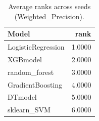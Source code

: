 \begin{table}[t]
\centering
\begin{tabular}{lr}
\toprule
Model & rank \\
\midrule
LogisticRegression & 1.0000 \\
XGBmodel & 2.0000 \\
random_forest & 3.0000 \\
GradientBoosting & 4.0000 \\
DTmodel & 5.0000 \\
sklearn_SVM & 6.0000 \\
\bottomrule
\end{tabular}
\caption{Average ranks across seeds (Weighted_Precision).}
\label{tab:avg_rank_Weighted_Precision}
\end{table}
